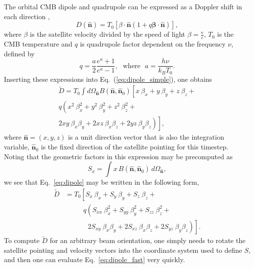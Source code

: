 \documentclass[twocolumn]{aa}
\begin{document}
The orbital CMB dipole and quadrupole can be expressed as a Doppler shift in each direction \citep{Notari:2015},
\begin{equation}
D(\hat{\boldsymbol n}) = T_0\left[ \beta \cdot \hat{\boldsymbol n}(1 + q\boldsymbol  \beta \cdot \hat{\boldsymbol n}) \right],
\label{eq:dipole_simple}
\end{equation}
where $\beta$ is the satellite velocity divided by the speed of light $\beta = \frac{\mathrm{v}}{c}$, $T_0$ is the CMB temperature and $q$ is quadrupole factor dependent on the frequency $\nu$, defined by 
\begin{equation}
q = \frac{a}{2} \frac{e^a + 1}{e^a -1}, \ \ \  \textrm{where} \ \ \ a = \frac{h\nu}{k_B T_0}.
\end{equation}
Inserting these expressions into Eq.~(\ref{eq:dipole_simple}), one obtains
\begin{equation}
\begin{split}
\tilde{D} = T_0 \int d\Omega_{\hat{\boldsymbol n}} B(\hat{\boldsymbol n}, \hat{\boldsymbol n}_0) \left[ x \ \beta_x + y\ \beta_y +  z\ \beta_z +\right. \\
q\left(x^2\ \beta^2_x + y^2\ \beta^2_y + z^2\ \beta^2_z + \right. \\
\left. \left. 2xy\ \beta_x\beta_y + 2xz\ \beta_x\beta_z + 2yz\ \beta_y\beta_z\right) \right],\label{eq:dipole}
\end{split}
\end{equation}
where $\hat{\boldsymbol n} = (x,y,z)$ is a unit direction vector that is also the integration variable, $\hat{\boldsymbol n}_0$ is the fixed direction of the satellite pointing for this timestep. Noting that the geometric factors in this expression may be precomputed as
\begin{equation}
S_{x} = \int x\, B(\hat{\boldsymbol n}, \hat{\boldsymbol n}_0)\, d\Omega_{\hat{\boldsymbol n}},
\end{equation}
we see that Eq.~\eqref{eq:dipole} may be written in the following form,
\begin{align}
\tilde{D} &= T_0 \left[ S_x \ \beta_x + S_y\ \beta_y +  S_z\ \beta_z +\right. \nonumber\\
  &\quad\quad\,\,\,\, q\left(S_{xx}\ \beta^2_x + S_{yy}\ \beta^2_y + S_{zz}\ \beta^2_z + \right. \nonumber\\
  &\quad\quad\quad\,\,\left.\left.2S_{xy}\ \beta_x\beta_y + 2S_{xz}\ \beta_x\beta_z + 2S_{yz}\ \beta_y\beta_z\right) \right]\label{eq:dipole_fast}.
\end{align}
To compute $\tilde{D}$ for an arbitrary beam orientation, one simply needs to rotate the satellite pointing and velocity vectors into the coordinate system used to define $S$, and then one can evaluate Eq.~\eqref{eq:dipole_fast} very quickly. 
\end{document}
